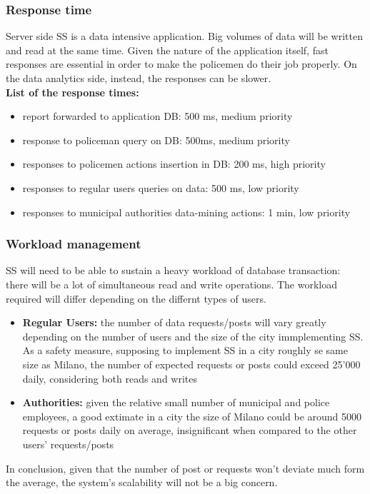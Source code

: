 	\subsubsection{Response time}
	
Server side SS is a data intensive application. Big volumes of data  will be written and read at the same time. Given the nature of the application itself, fast responses are essential in order to make the policemen do their job properly. On the data analytics side, instead, the responses can be slower.\\

\textbf{List of the response times:}
\begin{itemize}
\item report forwarded to application DB: 500 ms, medium priority
\item response to policeman query on DB: 500ms, medium priority
\item responses to policemen actions insertion in DB: 200 ms, high priority
\item responses to regular users queries on data: 500 ms, low priority
\item responses to municipal authorities data-mining actions: 1 min, low priority
\end{itemize}
\subsubsection{Workload management}
SS will need to be able to sustain a heavy workload of database transaction: there will be a lot of simultaneous read and write operations. The workload required will differ depending on the differnt types of users.
\begin{itemize}
	\item \textbf{Regular Users:} the number of data requests/posts will vary greatly depending on the number of users and the size of the city immplementing SS. As a safety measure, supposing to implement SS in a city roughly se same size as Milano, the number of expected requests or posts could exceed 25'000 daily, considering both reads and writes
	\item \textbf{Authorities: } given the relative small number of municipal and police employees, a good extimate in a city the size of Milano could be around 5000 requests or posts daily on average, insignificant when compared to the other users' requests/posts  
\end{itemize}
In conclusion, given that the number of post or requests won't deviate much form the average, the system's scalability will not be a big concern.


